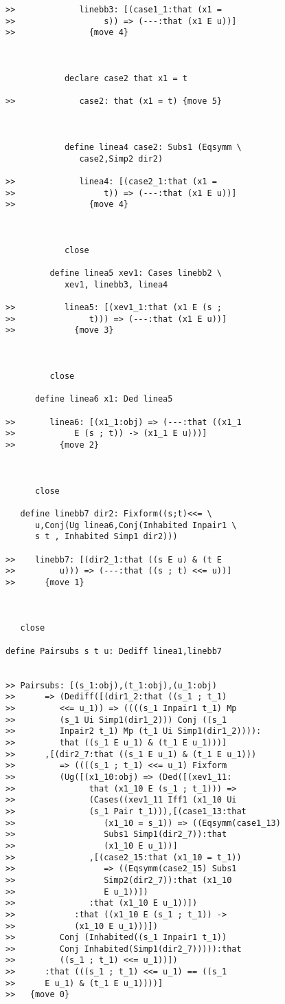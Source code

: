 \documentclass[12pt]{article}
\begin{document}
\begin{verbatim}
>>             linebb3: [(case1_1:that (x1 =
>>                  s)) => (---:that (x1 E u))]
>>               {move 4}



            declare case2 that x1 = t

>>             case2: that (x1 = t) {move 5}



            define linea4 case2: Subs1 (Eqsymm \
               case2,Simp2 dir2)

>>             linea4: [(case2_1:that (x1 =
>>                  t)) => (---:that (x1 E u))]
>>               {move 4}



            close

         define linea5 xev1: Cases linebb2 \
            xev1, linebb3, linea4

>>          linea5: [(xev1_1:that (x1 E (s ;
>>               t))) => (---:that (x1 E u))]
>>            {move 3}



         close

      define linea6 x1: Ded linea5

>>       linea6: [(x1_1:obj) => (---:that ((x1_1
>>            E (s ; t)) -> (x1_1 E u)))]
>>         {move 2}



      close

   define linebb7 dir2: Fixform((s;t)<<= \
      u,Conj(Ug linea6,Conj(Inhabited Inpair1 \
      s t , Inhabited Simp1 dir2)))

>>    linebb7: [(dir2_1:that ((s E u) & (t E
>>         u))) => (---:that ((s ; t) <<= u))]
>>      {move 1}



   close

define Pairsubs s t u: Dediff linea1,linebb7


>> Pairsubs: [(s_1:obj),(t_1:obj),(u_1:obj)
>>      => (Dediff([(dir1_2:that ((s_1 ; t_1)
>>         <<= u_1)) => ((((s_1 Inpair1 t_1) Mp
>>         (s_1 Ui Simp1(dir1_2))) Conj ((s_1
>>         Inpair2 t_1) Mp (t_1 Ui Simp1(dir1_2)))):
>>         that ((s_1 E u_1) & (t_1 E u_1)))]
>>      ,[(dir2_7:that ((s_1 E u_1) & (t_1 E u_1)))
>>         => ((((s_1 ; t_1) <<= u_1) Fixform
>>         (Ug([(x1_10:obj) => (Ded([(xev1_11:
>>               that (x1_10 E (s_1 ; t_1))) =>
>>               (Cases((xev1_11 Iff1 (x1_10 Ui
>>               (s_1 Pair t_1))),[(case1_13:that
>>                  (x1_10 = s_1)) => ((Eqsymm(case1_13)
>>                  Subs1 Simp1(dir2_7)):that
>>                  (x1_10 E u_1))]
>>               ,[(case2_15:that (x1_10 = t_1))
>>                  => ((Eqsymm(case2_15) Subs1
>>                  Simp2(dir2_7)):that (x1_10
>>                  E u_1))])
>>               :that (x1_10 E u_1))])
>>            :that ((x1_10 E (s_1 ; t_1)) ->
>>            (x1_10 E u_1)))])
>>         Conj (Inhabited((s_1 Inpair1 t_1))
>>         Conj Inhabited(Simp1(dir2_7))))):that
>>         ((s_1 ; t_1) <<= u_1))])
>>      :that (((s_1 ; t_1) <<= u_1) == ((s_1
>>      E u_1) & (t_1 E u_1))))]
>>   {move 0}




\end{verbatim}
\end{document}
